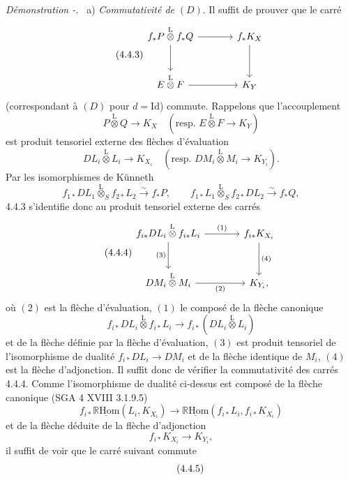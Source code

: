 \documentclass[11pt]{article}
\newenvironment{prooftext}[1][Proof]{\par\noindent\emph{#1.}\ }{\par\medskip}
\newcommand{\R}{\mathbb{R}}\newcommand{\RHomCore}{\mathbb{R}\mathrm{Hom}}
\providecommand{\RHom}{\RHomCore}
\providecommand{\uRHom}{\underline{\RHom}}
\providecommand{\Id}{\mathrm{Id}}
\providecommand{\lisom}{\xrightarrow{\sim}}
\providecommand{\RHom}{\RHomCore}
\providecommand{\RHom}{\R\mathcal{H}om}
\providecommand{\R}{\mathrm R}
\providecommand{\RHom}{\RHomCore}
\begin{document}
\begin{prooftext}[Démonstration -]
a) \emph{Commutativité de} $(D)$. Il suffit de prouver que le carré
\begin{equation}
\tag{4.4.3}
\begin{tikzcd}[column sep=large,row sep=large]
f_*P\overset{\mathrm{L}}{\otimes}f_*Q \arrow[r] \arrow[d] & f_*K_X \arrow[d]\\
E\overset{\mathrm{L}}{\otimes}F \arrow[r] & K_Y
\end{tikzcd}
\end{equation}
(correspondant à $(D)$ pour $d=\Id$) commute. Rappelons que l'accouplement
\[
P\overset{\mathrm{L}}{\otimes}Q\longrightarrow K_X
\quad(\text{resp. }E\overset{\mathrm{L}}{\otimes}F\longrightarrow K_Y)
\]
est produit tensoriel externe des flèches d'évaluation
\[
DL_i\overset{\mathrm{L}}{\otimes}L_i\longrightarrow K_{X_i}
\quad(\text{resp. }DM_i\overset{\mathrm{L}}{\otimes}M_i\longrightarrow K_{Y_i}).
\]
Par les isomorphismes de Künneth
\[
f_{1*}DL_1\overset{\mathrm{L}}{\otimes}_S f_{2*}L_2 \lisom f_*P,\qquad
f_{1*}L_1\overset{\mathrm{L}}{\otimes}_S f_{2*}DL_2 \lisom f_*Q,
\]
4.4.3 s'identifie donc au produit tensoriel externe des carrés
\begin{equation}
\tag{4.4.4}
\begin{tikzcd}[column sep=large,row sep=large]
f_{i*}DL_i\overset{\mathrm{L}}{\otimes} f_{i*}L_i
 \arrow[r,"(1)"] \arrow[d,"(3)"'] &
f_{i*}K_{X_i} \arrow[d,"(4)"]\\
DM_i\overset{\mathrm{L}}{\otimes}M_i \arrow[r,"(2)"'] & K_{Y_i},
\end{tikzcd}
\end{equation}
où $(2)$ est la flèche d'évaluation, $(1)$ le composé de la flèche canonique
\[
f_{i*}DL_i\overset{\mathrm{L}}{\otimes} f_{i*}L_i\longrightarrow f_{i*}(DL_i\overset{\mathrm{L}}{\otimes}L_i)
\]
et de la flèche
définie par la flèche d'évaluation, $(3)$ est produit tensoriel de l'isomorphisme de dualité $f_{i*}DL_i\longrightarrow DM_i$ et de la flèche identique de $M_i$, $(4)$ est la flèche d'adjonction. Il suffit donc de vérifier la commutativité des carrés 4.4.4. Comme l'isomorphisme de dualité ci-dessus est composé de la flèche canonique (SGA 4 XVIII 3.1.9.5)
\[
f_{i*}\uRHom(L_i,K_{X_i})\longrightarrow \uRHom(f_{i*}L_i,f_{i*}K_{X_i})
\]
et de la flèche déduite de la flèche d'adjonction
\[
f_{i*}K_{X_i}\longrightarrow K_{Y_i},
\]
il suffit de voir que le carré suivant commute
\begin{equation}
\tag{4.4.5}
\begin{tikzcd}[column sep=large,row sep=large]

\end{tikzcd}
\end{equation}
\end{prooftext}
\end{document}
